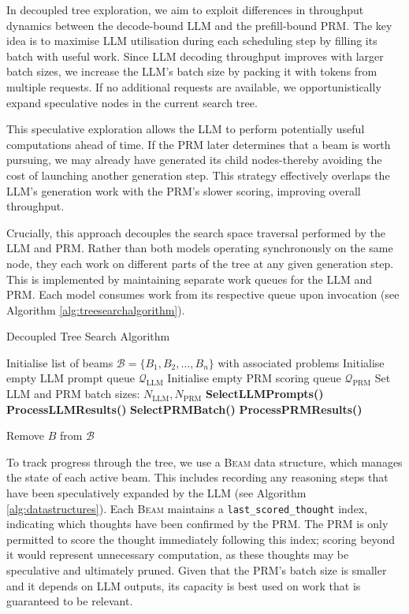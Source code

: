 \documentclass[11pt,twoside]{report}
\begin{document}
In decoupled tree exploration, we aim to exploit differences in throughput dynamics between the decode-bound LLM and the prefill-bound PRM. 
The key idea is to maximise LLM utilisation during each scheduling step by filling its batch with useful work. 
Since LLM decoding throughput improves with larger batch sizes, we increase the LLM’s batch size by packing it with tokens from multiple requests. 
If no additional requests are available, we opportunistically expand speculative nodes in the current search tree.

This speculative exploration allows the LLM to perform potentially useful computations ahead of time. 
If the PRM later determines that a beam is worth pursuing, we may already have generated its child nodes-thereby avoiding the cost of launching another generation step. 
This strategy effectively overlaps the LLM’s generation work with the PRM’s slower scoring, improving overall throughput.

Crucially, this approach decouples the search space traversal performed by the LLM and PRM. 
Rather than both models operating synchronously on the same node, they each work on different parts of the tree at any given generation step. 
This is implemented by maintaining separate work queues for the LLM and PRM. Each model consumes work from its respective queue upon invocation (see Algorithm \ref{alg:treesearchalgorithm}).

\begin{algorithm}[H]\label{alg:treesearchalgorithm}
\caption{Decoupled Tree Search Algorithm} 
\begin{algorithmic}[1]
\State Initialise list of beams $\mathcal{B} = \{B_1, B_2, \dots, B_n\}$ with associated problems
\State Initialise empty LLM prompt queue $\mathcal{Q}_{\text{LLM}}$
\State Initialise empty PRM scoring queue $\mathcal{Q}_{\text{PRM}}$
\State Set LLM and PRM batch sizes: $N_{\text{LLM}}, N_{\text{PRM}}$
    \State \textbf{SelectLLMPrompts()}
    \State \textbf{ProcessLLMResults()}
    \State \textbf{SelectPRMBatch()}
    \State \textbf{ProcessPRMResults()}

        \State Remove $B$ from $\mathcal{B}$
      \EndIf
    \EndFor
\EndWhile
\end{algorithmic}
\end{algorithm}

To track progress through the tree, we use a \textsc{Beam} data structure, which manages the state of each active beam. 
This includes recording any reasoning steps that have been speculatively expanded by the LLM (see Algorithm \ref{alg:datastructures}). 
Each \textsc{Beam} maintains a \texttt{last\_scored\_thought} index, indicating which thoughts have been confirmed by the PRM. 
The PRM is only permitted to score the thought immediately following this index; scoring beyond it would represent unnecessary computation, as these thoughts may be speculative and ultimately pruned. 
Given that the PRM’s batch size is smaller and it depends on LLM outputs, its capacity is best used on work that is guaranteed to be relevant.
\end{document}
